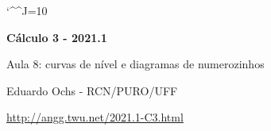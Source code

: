 \documentclass[oneside,12pt]{article}
\begin{document}
\catcode`\^^J=10

\pu

\long{}
\long{}
\long{}
\long{}
\long{}
\long{}
\long{}
\long{}
\long{}
\long{}
\long{}

\long{}
\long{}

\def\pictgray#1{{\color{GrayPale}\linethickness{0.3pt}#1}}

\def\frown{\ensuremath{{=}{(}}}
\def\True {\mathbf{V}}
\def\False{\mathbf{F}}
\def\D    {\displaystyle}

\def\drafturl{http://angg.twu.net/LATEX/2021-1-C3.pdf}
\def\drafturl{http://angg.twu.net/2021.1-C3.html}
\def\draftfooter{\tiny \href{\drafturl}{\jobname{}} \ColorBrown{\shorttoday{} \hours}}



%

\thispagestyle{empty}

\begin{center}

\vspace*{1.2cm}

{\bf \Large Cálculo 3 - 2021.1}

\bsk

Aula 8: curvas de nível e diagramas de numerozinhos

\bsk

Eduardo Ochs - RCN/PURO/UFF

\url{http://angg.twu.net/2021.1-C3.html}

\end{center}
\end{document}
